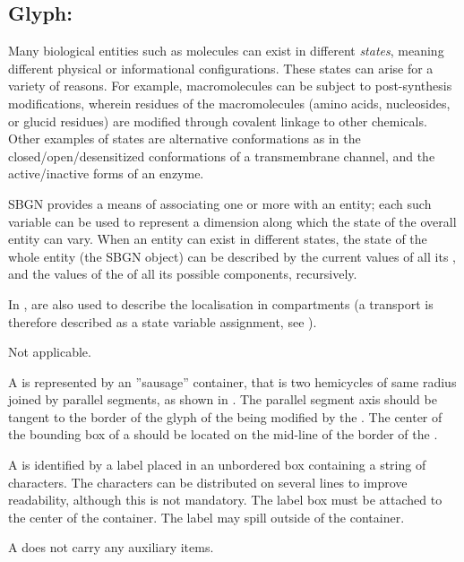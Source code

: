 
\color{blue}

\subsection{Glyph: }
\label{sec:stateVariable}

Many biological entities such as molecules can exist in different \emph{states}, meaning different physical or informational configurations.  These states can arise for a variety of reasons.  For example, macromolecules can be subject to post-synthesis modifications, wherein residues of the macromolecules (amino acids, nucleosides, or glucid residues) are modified through covalent linkage to other chemicals.  Other examples of states are alternative conformations as in the closed/open/desensitized conformations of a transmembrane channel, and the active/inactive forms of an enzyme.

SBGN provides a means of associating one or more  with an entity; each such variable can be used to represent a dimension along which the state of the overall entity can vary.  When an entity can exist in different states, the state of the whole entity (\ie the SBGN object) can be described by the current values of all its , and the values of the  of all its possible components, recursively.

In \SBGNERLone,  are also used to describe the localisation in compartments (a transport is therefore described as a state variable assignment, see ).

\begin{glyphDescription}

\glyphSboTerm Not applicable.

\glyphContainer A  is represented by an ''sausage'' container, that is two hemicycles of same radius joined by parallel segments, as shown in .  The parallel segment axis should be tangent to the border of the glyph of the  being modified by the . The center of the bounding box of a  should be located on the mid-line of the border of the .

\glyphLabel A  is identified by a label placed in an unbordered box containing a string of characters.  The characters can be distributed on several lines to improve readability, although this is not mandatory.  The label box must be attached to the center of the container.  The label may spill outside of the container.

\glyphAux A  does not carry any auxiliary items.

\end{glyphDescription}

